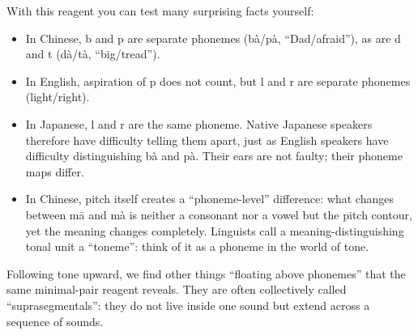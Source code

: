 With this reagent you can test many surprising facts yourself:

\begin{itemize}
\item In Chinese, b and p are separate phonemes (bà/pà, ``Dad/afraid''), as are d and t (dà/tà, ``big/tread'').
\item In English, aspiration of p does not count, but l and r are separate phonemes (light/right).
\item In Japanese, l and r are the same phoneme. Native Japanese speakers therefore have difficulty telling them apart, just as English speakers have difficulty distinguishing bà and pà. Their ears are not faulty; their phoneme maps differ.
\item In Chinese, pitch itself creates a ``phoneme-level'' difference: what changes between mā and mà is neither a consonant nor a vowel but the pitch contour, yet the meaning changes completely. Linguists call a meaning-distinguishing tonal unit a ``toneme'': think of it as a phoneme in the world of tone.
\end{itemize}
Following tone upward, we find other things ``floating above phonemes'' that the same minimal-pair reagent reveals. They are often collectively called ``suprasegmentals'': they do not live inside one sound but extend across a sequence of sounds.


